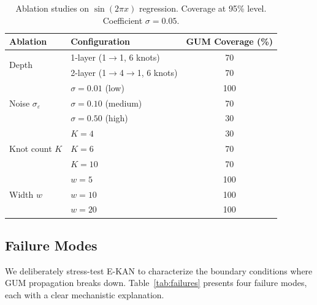 \documentclass{article}
\begin{document}
\begin{table}[t]
\centering
\caption{Ablation studies on $\sin(2\pi x)$ regression.  Coverage at 95\%
level.  Coefficient $\sigma = 0.05$.}
\label{tab:ablation}
\begin{tabular}{@{}llc@{}}
\toprule
\textbf{Ablation} & \textbf{Configuration} & \textbf{GUM Coverage (\%)} \\
\midrule
\multirow{2}{*}{Depth}
  & 1-layer (1$\to$1, 6 knots)   & 70 \\
  & 2-layer (1$\to$4$\to$1, 6 knots) & 70 \\
\midrule
\multirow{3}{*}{Noise $\sigma_\varepsilon$}
  & $\sigma=0.01$ (low)   & 100 \\
  & $\sigma=0.10$ (medium) & 70 \\
  & $\sigma=0.50$ (high)   & 30 \\
\midrule
\multirow{3}{*}{Knot count $K$}
  & $K=4$  & 30 \\
  & $K=6$  & 70 \\
  & $K=10$ & 70 \\
\midrule
\multirow{3}{*}{Width $w$}
  & $w=5$  & 100 \\
  & $w=10$ & 100 \\
  & $w=20$ & 100 \\
\bottomrule
\end{tabular}
\end{table}


\subsection{Failure Modes}
\label{sec:failures}

We deliberately stress-test E-KAN to characterize the boundary conditions
where GUM propagation breaks down.  Table~\ref{tab:failures} presents four
failure modes, each with a clear mechanistic explanation.
\end{document}
